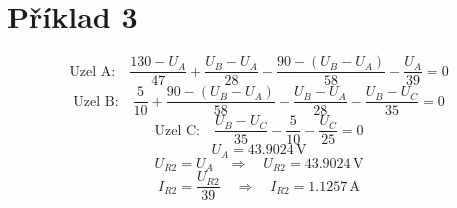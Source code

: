 \section{Příklad 3}
\[
    \text{Uzel A:} \quad \frac{130 - U_A}{47} + \frac{U_B -U_A}{28} - \frac{90 - (U_B - U_A)}{58} - \frac{U_A}{39} = 0
\]
\[
    \text{Uzel B:} \quad \frac{5}{10} + \frac{90 - (U_B - U_A)}{58} - \frac{U_B - U_A}{28} - \frac{U_B -U_C}{35} = 0
\]
\[
    \text{Uzel C:} \quad \frac{U_B - U_C}{35} - \frac{5}{10} - \frac{U_C}{25} = 0
\]
\[
    U_A = 43.9024 \, \text{V}
\]
\[
    U_{R2} = U_A  \quad \Rightarrow \quad U_{R2} = 43.9024 \, \text{V}
\]
\[
    I_{R2} = \frac{U_{R2}}{39} \quad \Rightarrow \quad I_{R2} = 1.1257 \, \text{A}
\]

